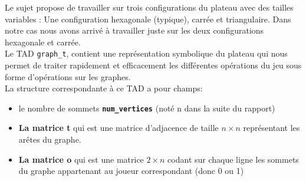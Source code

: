 \documentclass[a4paper,10pt]{article}
\begin{document}
Le sujet propose de travailler sur trois configurations du plateau avec des tailles variables : Une configuration hexagonale (typique), carrée et triangulaire. Dans notre cas nous avons arrivé à travailler juste sur les deux configurations hexagonale et carrée. \\

Le TAD \texttt{graph\_t}, contient une représentation symbolique du plateau qui nous permet de traiter rapidement et efficacement les différentes opérations du jeu sous forme d’opérations sur les graphes.\\
La structure correspondante à ce TAD a pour champs: 
\begin{itemize}
    \item le nombre de sommets \textbf{\texttt{num\_vertices}} (noté n dans la suite du rapport)
    \item \textbf{La matrice t} qui est une matrice d'adjacence de taille $n\times n$ représentant les arêtes du graphe.
    \item \textbf{La matrice o} qui est une matrice $2\times n$ codant sur chaque ligne les sommets du graphe appartenant au joueur correspondant (donc 0 ou 1)
\end{itemize}
\end{document}
